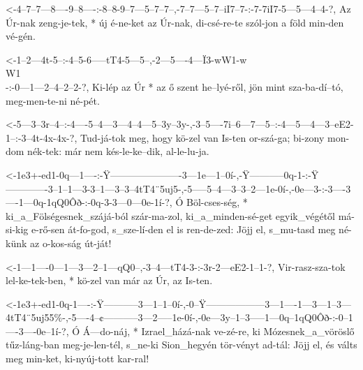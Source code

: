   {<-4--7--7---8----9--8----:-8--8-9--7---5--7--7--,-7--7---5--7--iI7--7-:-7-7iI7-5---5---4--4-?,}
  {  Az Úr-nak zeng-je-tek, * új é-ne-ket az Úr-nak, di-csé-re-te szól-jon a föld min-den vé-gén.}


  {<-1--2---4t-5--:-4--5-6-----tT4-5---5--,-2---5----4---Ï3-wW1-w\\W1\\-:-0---1---2--4--2--2-?,}
  {  Ki-lép az Úr * az ő szent he--lyé-ről, jön mint sza-ba-dí--tó,       meg-men-te-ni né-pét.}



  {<-5---3--3r--4--:-4----5--4---3---4--4---5--3y--3y-,-3--5----7i--6---7---5--:-4---5---4---3--eE2-1--:-3--4t-4x-4x-?,}
  {  Tud-já-tok meg, hogy kö-zel van Is-ten or-szá-ga;  bi-zony mon-dom nék-tek: már nem kés-le-ke--dik, al-le-lu-ja.}

  {<-1e3+-ed1-0q---1----:-Ÿ----------------------3---1e---1--0í-,-Ÿ-----------0q-1-:-Ÿ-------------3--1--1---3-3--1---3--3--4tT4¨5uj5-,-5-----5--4---3--3--2---1e-0í-,-0e---3-:-3----3----1---0q-1qQ0Ôð-:-0q-3-3---0---0e-1í-?,}
  {  Ó    Böl-cses-ség, * ki_a_Fölségesnek_szájá-ból szár-ma-zol, ki_a_minden-sé-get egyik_végétől má-si-kig e-rő-sen át-fo-god,        s_sze-lí-den el is ren-de-zed: Jöjj el, s_mu-tasd meg né-künk     az o-kos-ság út-ját!}


  {<-1---1----0---1---3---2--1---qQ0--,-3--4---tT4-3-:-3r-2---eE2-1--1-?,}
  {  Vir-rasz-sza-tok lel-ke-tek-ben, * kö-zel van már az Úr, az  Is-ten.}

  {<-1e3+-ed1-0q-1----:-Ÿ-----------3---1--1--0í-,-0--Ÿ------------------3---1----1---3---1--3---4tT4¨5uj55\%-,-5----4--¢-----------3---2-----1e-0í-,-0e---3y--1--3-----1---0q--1qQ0Ôð-:-0--1----3----0e--1í-?,}
  {  Ó    Á---do-náj, * Izrael_házá-nak ve-zé-re,  ki Mózesnek_a_vöröslő tűz-láng-ban meg-je-len-tél,           s_ne-ki Sion_hegyén tör-vényt ad-tál: Jöjj el, és válts meg min-ket,     ki-nyúj-tott kar-ral!}

